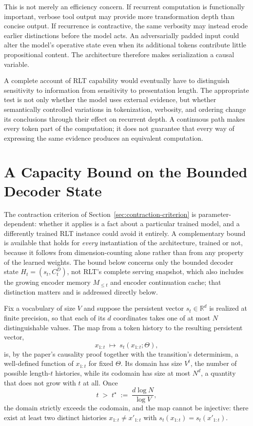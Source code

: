 \documentclass[11pt]{article}
\begin{document}
This is not merely an efficiency concern. If recurrent computation is functionally important, verbose tool output may provide more transformation depth than concise output. If recurrence is contractive, the same verbosity may instead erode earlier distinctions before the model acts. An adversarially padded input could alter the model's operative state even when its additional tokens contribute little propositional content. The architecture therefore makes serialization a causal variable.

A complete account of RLT capability would eventually have to distinguish sensitivity to information from sensitivity to presentation length. The appropriate test is not only whether the model uses external evidence, but whether semantically controlled variations in tokenization, verbosity, and ordering change its conclusions through their effect on recurrent depth. A continuous path makes every token part of the computation; it does not guarantee that every way of expressing the same evidence produces an equivalent computation.

\section{A Capacity Bound on the Bounded Decoder State}
\label{sec:capacity-bound}

The contraction criterion of Section~\ref{sec:contraction-criterion} is parameter-dependent: whether it applies is a fact about a particular trained model, and a differently trained RLT instance could avoid it entirely. A complementary bound is available that holds for \emph{every} instantiation of the architecture, trained or not, because it follows from dimension-counting alone rather than from any property of the learned weights. The bound below concerns only the bounded decoder state $H_t = (s_t, C_t^D)$, not RLT's complete serving snapshot, which also includes the growing encoder memory $M_{\le t}$ and encoder continuation cache; that distinction matters and is addressed directly below.

Fix a vocabulary of size $V$ and suppose the persistent vector $s_t \in \mathbb{R}^d$ is realized at finite precision, so that each of its $d$ coordinates takes one of at most $N$ distinguishable values. The map from a token history to the resulting persistent vector,
\[
x_{1:t} \;\longmapsto\; s_t(x_{1:t}; \Theta),
\]
is, by the paper's causality proof together with the transition's determinism, a well-defined function of $x_{1:t}$ for fixed $\Theta$. Its domain has size $V^t$, the number of possible length-$t$ histories, while its codomain has size at most $N^d$, a quantity that does not grow with $t$ at all. Once
\[
t \;>\; t^\star \;:=\; \frac{d \log N}{\log V},
\]
the domain strictly exceeds the codomain, and the map cannot be injective: there exist at least two distinct histories $x_{1:t} \ne x'_{1:t}$ with $s_t(x_{1:t}) = s_t(x'_{1:t})$.
\end{document}

